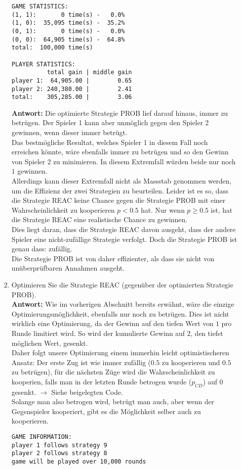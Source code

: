 \documentclass[12pt,a4paper]{article}
\begin{document}
\begin{enumerate}
\begin{enumerate}
\begin{verbatim}
GAME STATISTICS:
(1, 1):       0 time(s) -   0.0%
(1, 0):  35,095 time(s) -  35.2%
(0, 1):       0 time(s) -   0.0%
(0, 0):  64,905 time(s) -  64.8%
total:  100,000 time(s)

PLAYER STATISTICS:
          total gain | middle gain
player 1:  64,905.00 |        0.65
player 2: 240,380.00 |        2.41
total:    305,285.00 |        3.06
\end{verbatim}
\textbf{Antwort:} Die optimierte Strategie PROB lief darauf hinaus, immer zu betrügen. Der Spieler 1 kann aber unmöglich gegen den Spieler 2 gewinnen, wenn dieser immer betrügt.\\
Das bestmögliche Resultat, welches Spieler 1 in diesem Fall noch erreichen könnte, wäre ebenfalls immer zu betrügen und so den Gewinn von Spieler 2 zu minimieren.
In diesem Extremfall würden beide nur noch $1$ gewinnen.\\
Allerdings kann dieser Extremfall nicht als Massstab genommen werden, um die Effizienz der zwei Strategien zu beurteilen.
Leider ist es so, dass die Strategie REAC keine Chance gegen die Strategie PROB mit einer Wahrscheinlichkeit zu kooperieren $p<0.5$ hat.
Nur wenn $p \geq 0.5$ ist, hat die Strategie REAC eine realistische Chance zu gewinnen.\\
Dies liegt daran, dass die Strategie REAC davon ausgeht, dass der andere Spieler eine nicht-zufällige Strategie verfolgt.
Doch die Strategie PROB ist genau dass: zufällig.\\
Die Strategie PROB ist von daher effizienter, als dass sie nicht von unüberprüfbaren Annahmen ausgeht.
\newpage

\item Optimieren Sie die Strategie REAC (gegenüber der optimierten Strategie PROB).\\
\textbf{Antwort:} Wie im vorherigen Abschnitt bereits erwähnt, wäre die einzige Optimierungsmöglichkeit, ebenfalls nur noch zu betrügen.
Dies ist nicht wirklich eine Optimierung, da der Gewinn auf den tiefen Wert von $1$ pro Runde limitiert wird.
So wird der kumulierte Gewinn auf $2$, den tiefst möglichen Wert, gesenkt.\\
Daher folgt unsere Optimierung einem immerhin leicht optimistischeren Ansatz:
Der erste Zug ist wie immer zufällig ($0.5$ zu kooperieren und $0.5$ zu betrügen), für die nächsten Züge wird die Wahrscheinlichkeit zu kooperien,
falls man in der letzten Runde betrogen wurde ($p_{CD}$) auf $0$ gesenkt. $\rightarrow$ Siehe beigelegten Code.\\
Solange man also betrogen wird, betrügt man auch, aber wenn der Gegenspieler kooperiert, gibt es die Möglichkeit selber auch zu kooperieren.
\begin{verbatim}
GAME INFORMATION:
player 1 follows strategy 9
player 2 follows strategy 8
game will be played over 10,000 rounds


\end{verbatim}
\end{enumerate}
\end{enumerate}
\end{document}
